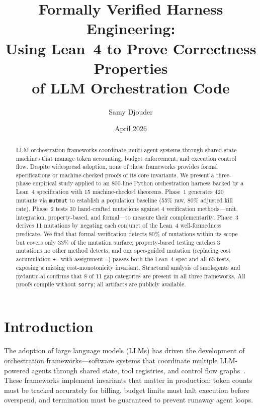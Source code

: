 \documentclass[11pt,a4paper]{article}
\title{Formally Verified Harness Engineering:\\
  Using Lean~4 to Prove Correctness Properties\\
  of LLM Orchestration Code}
\author{Samy Djouder}
\date{April 2026}
\begin{document}
\maketitle

\begin{abstract}

LLM orchestration frameworks coordinate multi-agent systems through
shared state machines that manage token accounting, budget enforcement,
and execution control flow. Despite widespread adoption, none of these
frameworks provides formal specifications or machine-checked proofs of
its core invariants. We present a three-phase empirical study applied
to an 800-line Python orchestration harness backed by a Lean~4
specification with 15 machine-checked theorems. Phase~1 generates
420 mutants via \texttt{mutmut} to establish a population baseline
(55\% raw, 80\% adjusted kill rate). Phase~2 tests 30 hand-crafted
mutations against 4 verification methods---unit, integration,
property-based, and formal---to measure their complementarity.
Phase~3 derives 11 mutations by negating each conjunct of the Lean~4
well-formedness predicate. We find that formal verification detects
80\% of mutations within its scope but covers only 33\% of the mutation
surface; property-based testing catches 3 mutations no other method
detects; and one spec-guided mutation (replacing cost accumulation
\texttt{+=} with assignment \texttt{=}) passes both the Lean~4 spec
and all 65 tests, exposing a missing cost-monotonicity invariant.
Structural analysis of smolagents and pydantic-ai confirms that 8 of
11 gap categories are present in all three frameworks. All proofs
compile without \texttt{sorry}; all artifacts are publicly available.

\end{abstract}

\section{Introduction}
\label{sec:intro}

The adoption of large language models (LLMs) has driven the development
of orchestration frameworks---software systems that coordinate multiple
LLM-powered agents through shared state, tool registries, and control
flow graphs~\cite{langgraph2024,crewai2024,autogen2024}. These
frameworks implement invariants that matter in production: token counts
must be tracked accurately for billing, budget limits must halt
execution before overspend, and termination must be guaranteed to
prevent runaway agent loops.
\end{document}
